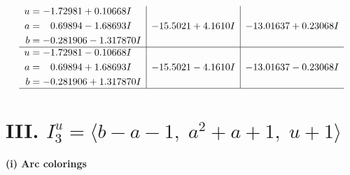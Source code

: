 \documentclass[1p]{elsarticle_modified}
\theoremstyle{definition}
\begin{document}
$$\begin{array}{c|c|c}
\begin{aligned}
u &= -1.72981 + 0.10668 I \\
a &= \phantom{-}0.69894 - 1.68693 I \\
b &= -0.281906 - 1.317870 I\end{aligned}
 & -15.5021 + 4.1610 I & -13.01637 + 0.23068 I \\ \hline\begin{aligned}
u &= -1.72981 - 0.10668 I \\
a &= \phantom{-}0.69894 + 1.68693 I \\
b &= -0.281906 + 1.317870 I\end{aligned}
 & -15.5021 - 4.1610 I & -13.01637 - 0.23068 I\\
 \hline 
 \end{array}$$\newpage\newpage\renewcommand{\arraystretch}{1}
\centering \section*{III. $I^u_{3}= \langle b- a-1,\;a^2+a+1,\;u+1 \rangle$}
\flushleft \textbf{(i) Arc colorings}\\
\end{document}
